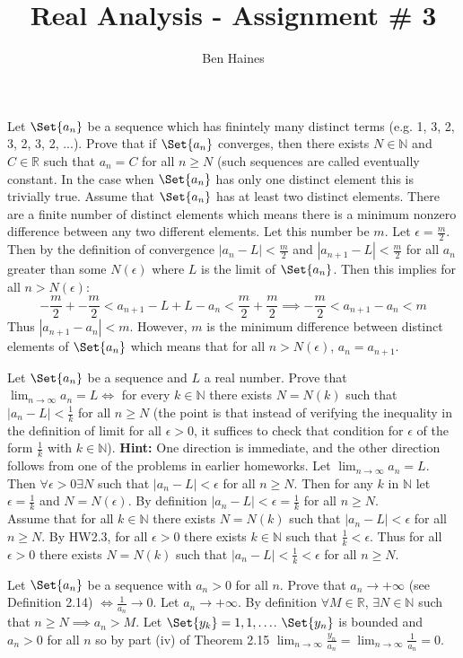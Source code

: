 \documentclass[paper=a4, fontsize=11pt]{jhwhw} %
\begin{document}
\title{Real Analysis - Assignment \# 3}
\author{Ben Haines}

Let $\Set{a_n}$ be a sequence which has finintely many distinct terms (e.g. 1, 3, 2, 3, 2, 3, 2, ...). Prove that if $\Set{a_n}$ converges, then there exists $N\in \mathbb N$ and $C\in \mathbb R$ such that $a_n = C$ for all $n\ge N$ (such sequences are called eventually constant.
\solution
In the case when $\Set{a_n}$ has only one distinct element this is trivially true. Assume that $\Set{a_n}$ has at least two distinct elements. There are a finite number of distinct elements which means there is a minimum nonzero difference between any two different elements. Let this number be $m$. Let $\epsilon = \frac{m}{2}$. Then by the definition of convergence $|a_n - L| < \frac{m}{2}$ and $|a_{n+1} - L| < \frac{m}{2}$ for all $a_n$ greater than some $N(\epsilon)$ where $L$ is the limit of $\Set{a_n}$. Then this implies for all $n > N(\epsilon)$:
$$-\frac{m}{2} + -\frac{m}{2} < a_{n+1} - L + L - a_{n} < \frac{m}{2} + \frac{m}{2} \implies -\frac{m}{2} < a_{n+1} - a_n < m$$
Thus $|a_{n+1} - a_n| < m$. However, $m$ is the minimum difference between distinct elements of $\Set{a_n}$ which means that for all $n > N(\epsilon)$, $a_n = a_{n+1}$. 

Let $\Set{a_n}$ be a sequence and $L$ a real number. Prove that $\lim_{n\to\infty}a_n = L \iff$ for every $k\in \mathbb N$ there exists $N = N(k)$ such that $|a_n - L| < \frac{1}{k}$ for all $n\ge N$ (the point is that instead of verifying the inequality in the definition of limit for all $\epsilon > 0$, it suffices to check that condition for $\epsilon $ of the form $\frac{1}{k}$ with $k\in \mathbb N$). \textbf{Hint:} One direction is immediate, and the other direction follows from one of the problems in earlier homeworks.
\solution
Let $\lim_{n\to \infty}a_n = L$. Then $\forall \epsilon > 0 \exists N$ such that $|a_n - L| < \epsilon $ for all $n \ge N$. Then for any $k$ in $\mathbb N$ let $\epsilon = \frac{1}{k}$ and $N = N(\epsilon)$. By definition $|a_n - L| < \epsilon = \frac{1}{k}$ for all $n \ge N$. \\

Assume that for all $k\in \mathbb N$ there exists $N = N(k)$ such that $|a_n - L| < \epsilon $ for all $n \ge N$. By HW2.3, for all $\epsilon > 0$ there exists $k\in \mathbb N$ such that $\frac{1}{k} < \epsilon $. Thus for all $\epsilon > 0$ there exists $N = N(k)$ such that $|a_n - L| < \frac{1}{k} < \epsilon $ for all $n \ge N$. 

Let $\Set{a_n}$ be a sequence with $a_n > 0$ for all $n$. Prove that $a_n \to +\infty$ (see Definition 2.14) $\iff \frac{1}{a_n} \to 0$.
\solution
Let $a_n \to +\infty$. By definition $\forall M\in \mathbb R$, $\exists N\in \mathbb N$ such that $n\ge N\implies a_n > M$. Let $\Set{y_k} = 1, 1, \ldots$. $\Set{y_n}$ is bounded and $a_n > 0$ for all $n$ so by part (iv) of Theorem 2.15 $\lim_{n\to \infty}\frac{y_n}{a_n} = \lim_{n\to \infty}\frac{1}{a_n} = 0$. 
\end{document}
